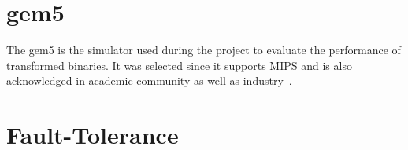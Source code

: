 \section{gem5}
The gem5 is the simulator used during the project to evaluate the performance
of transformed binaries. It was selected since it supports MIPS and
is also acknowledged in academic community as well as industry~\cite{gem5}.

\section{Fault-Tolerance}

